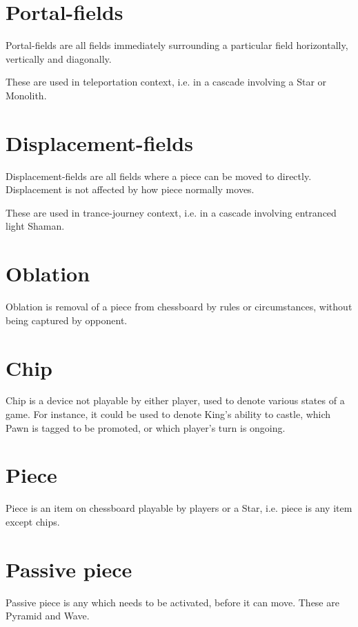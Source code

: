 \section*{Portal-fields}
\label{sec:Terms/Portal-fields}
Portal-fields are all fields immediately surrounding a particular field horizontally,
vertically and diagonally.

These are used in teleportation context, i.e. in a cascade involving a Star or Monolith.

\section*{Displacement-fields}
\label{sec:Terms/Displacement-fields}
Displacement-fields are all fields where a piece can be moved to directly.
Displacement is not affected by how piece normally moves.

These are used in trance-journey context, i.e. in a cascade involving entranced light Shaman.

\section*{Oblation}
\label{sec:Terms/Oblation}
Oblation is removal of a piece from chessboard by rules or circumstances,
without being captured by opponent.

\section*{Chip}
\label{sec:Terms/Chip}
Chip is a device not playable by either player, used to denote various states
of a game. For instance, it could be used to denote King's ability to castle,
which Pawn is tagged to be promoted, or which player's turn is ongoing.

\section*{Piece}
\label{sec:Terms/Piece}
Piece is an item on chessboard playable by players or a Star, i.e. piece is
any item except chips.

\section*{Passive piece}
\label{sec:Terms/Passive piece}
Passive piece is any which needs to be activated, before it can move.
These are Pyramid and Wave.

